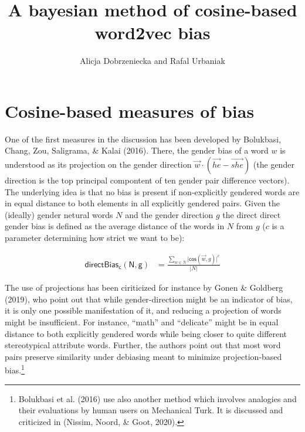 \documentclass[10pt,dvipsnames,enabledeprecatedfontcommands]{scrartcl}
\title{A bayesian method of cosine-based word2vec bias}
\author{Alicja Dobrzeniecka and Rafal Urbaniak}
\date{}
\begin{document}
\maketitle

\section{Cosine-based measures of
bias}\label{cosine-based-measures-of-bias}

One of the first measures in the discussion has been developed by
Bolukbasi, Chang, Zou, Saligrama, \& Kalai (2016). There, the gender
bias of a word \(w\) is understood as its projection on the gender
direction \(\vec{w} \cdot (\overrightarrow{he} - \overrightarrow{she})\)
(the gender direction is the top principal compontent of ten gender pair
difference vectors). The underlying idea is that no bias is present if
non-explicitly gendered words are in equal distance to both elements in
all explicitly gendered pairs. Given the (ideally) gender netural words
\(N\) and the gender direction \(g\) the direct direct gender bias is
defined as the average distance of the words in \(N\) from \(g\) (\(c\)
is a parameter determining how strict we want to be):

\begin{align}
\mathsf{directBias_c(N,g)} & = \frac{\sum_{w\in N}\vert \mathsf{cos}(\vec{w},g)\vert^c}{\vert N \vert }
\end{align}

The use of projections has been ciriticized for instance by Gonen \&
Goldberg (2019), who point out that while gender-direction might be an
indicator of bias, it is only one possible manifestation of it, and
reducing a projection of words might be insufficient. For instance,
``math'' and ``delicate'' might be in equal distance to both explicitly
gendered words while being closer to quite different stereotypical
attribute words. Further, the authors point out that most word pairs
preserve similarity under debiasing meant to minimize projection-based
bias.\footnote{Bolukbasi et al. (2016) use also another method which
  involves analogies and their evaluations by human users on Mechanical
  Turk. It is discussed and criticized in (Nissim, Noord, \& Goot,
  2020).}
\end{document}
